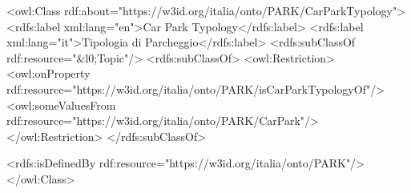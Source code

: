 <owl:Class rdf:about="https://w3id.org/italia/onto/PARK/CarParkTypology">
  <rdfs:label xml:lang="en">Car Park Typology</rdfs:label>
  <rdfs:label xml:lang="it">Tipologia di Parcheggio</rdfs:label>
  <rdfs:subClassOf rdf:resource="&l0;Topic"/>
  <rdfs:subClassOf>
    <owl:Restriction>
      <owl:onProperty rdf:resource="https://w3id.org/italia/onto/PARK/isCarParkTypologyOf"/>
      <owl:someValuesFrom rdf:resource="https://w3id.org/italia/onto/PARK/CarPark"/>
    </owl:Restriction>
  </rdfs:subClassOf>
        
  <rdfs:isDefinedBy rdf:resource="https://w3id.org/italia/onto/PARK"/>
</owl:Class>